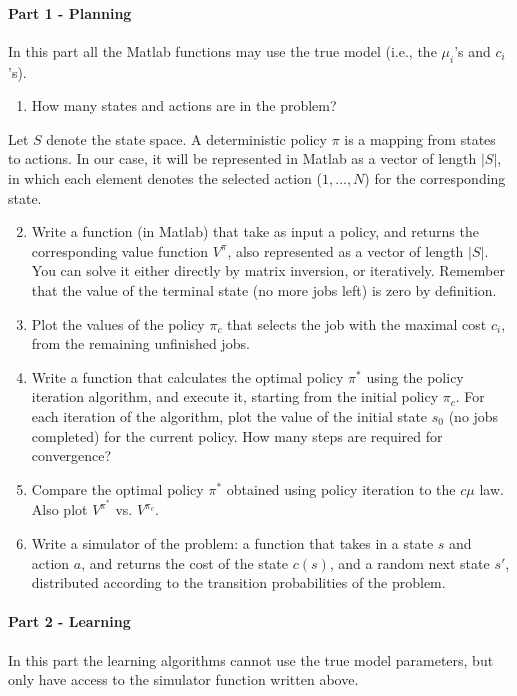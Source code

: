 \begin{exercise}
\paragraph{Part 1 - Planning}
In this part all the Matlab functions may use the true model (i.e., the ${\mu _i}$'s and ${c_i}$'s).
\begin{enumerate}
  \item How many states and actions are in the problem?
\end{enumerate}  
  Let $S$ denote the state space. A deterministic policy $\pi $ is a mapping from states to actions. In our case, it will be represented in Matlab as a vector of length $|S|$, in which each element denotes the selected action ($1, \ldots ,N$) for the corresponding state.
\begin{enumerate} 
\setcounter{enumi}{1} 
  \item Write a function (in Matlab) that take as input a policy, and returns the corresponding value function ${V^\pi }$, also represented as a vector of length $|S|$. You can solve it either directly by matrix inversion, or iteratively. Remember that the value of the terminal state (no more jobs left) is zero by definition.
  \item Plot the values of the policy ${\pi _c}$ that selects the job with the maximal cost ${c_i}$, from the remaining unfinished jobs.
  \item Write a function that calculates the optimal policy ${\pi ^*}$ using the policy iteration algorithm, and execute it, starting from the initial policy ${\pi _c}$. For each iteration of the algorithm, plot the value of the initial state ${s_0}$ (no jobs completed) for the current policy. How many steps are required for convergence?
  \item Compare the optimal policy ${\pi ^*}$ obtained using policy iteration to the $c\mu $ law. Also plot ${V^{{\pi ^*}}}$ vs. ${V^{{\pi _c}}}$.
  \item Write a simulator of the problem: a function that takes in a state $s$ and action $a$, and returns the cost of the state $c(s)$, and a random next state $s'$, distributed according to the transition probabilities of the problem.
\end{enumerate}

\paragraph{Part 2 - Learning}
In this part the learning algorithms cannot use the true model parameters, but only have access to the simulator function written above.


\end{exercise}
